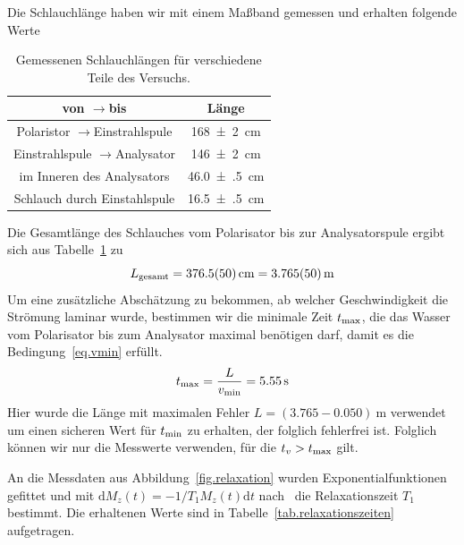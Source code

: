 \documentclass[paper=a4,
	fontsize=10pt,
	DIV=18,
	twocolumn,
	parskip=half
	]{scrartcl}
\numberwithin{equation}{section}    %
\newcommand{\tra}{$\rightarrow$}
\begin{document}
Die Schlauchlänge haben wir mit einem Maßband gemessen und erhalten folgende Werte

\begin{table}[htp]
	\begin{center}
	\begin{tabular}{cc}
		\hline
		von \tra bis & Länge \\
		\hline
		Polaristor \tra Einstrahlspule & \SI{168(2)}{\centi\meter}\\
		Einstrahlspule \tra Analysator & \SI{146(2)}{\centi\meter}\\
		im Inneren des Analysators & \SI{46.0(5)}{\centi\meter}\\
		Schlauch durch Einstahlspule & \SI{16.5(5)}{\centi\meter}\\
		\hline
	\end{tabular}
	\caption{Gemessenen Schlauchlängen für verschiedene Teile des Versuchs.}
	\label{tab.schlauch}
	\end{center}
\end{table}

Die Gesamtlänge des Schlauches vom Polarisator bis zur Analysatorspule ergibt sich aus Tabelle~\ref{tab.schlauch} zu 
\begin{equation}
	L_{\rm gesamt} = \SI{376.5(50)}{\centi\meter} = \SI{3.765(50)}{\meter}
\end{equation}
Um eine zusätzliche Abschätzung zu bekommen, ab welcher Geschwindigkeit die Strömung laminar wurde, bestimmen wir die minimale Zeit $t_{\rm max}$, die das Wasser vom Polarisator bis zum Analysator maximal benötigen darf, damit es die Bedingung~\eqref{eq.vmin} erfüllt.
\begin{equation}
	t_{\rm max} = \frac{L}{v_{\rm min}} = \SI{5.55}{\second}
\end{equation}
Hier wurde die Länge mit maximalen Fehler $L = (3.765-0.050)\SI{}{\meter}$ verwendet um einen sicheren Wert für $t_{\rm min}$ zu erhalten, der folglich fehlerfrei ist. Folglich können wir nur die Messwerte verwenden, für die $t_v>t_{\rm max}$ gilt.

An die Messdaten aus Abbildung~\ref{fig.relaxation} wurden Exponentialfunktionen gefittet und mit $\mathrm{d}M_{z}(t) = -1/T_1 M_{z}(t)\mathrm{d}t$ nach~\citet{anleitung} die Relaxationszeit $T_1$ bestimmt. Die erhaltenen Werte sind in Tabelle~\ref{tab.relaxationszeiten} aufgetragen.
\end{document}
